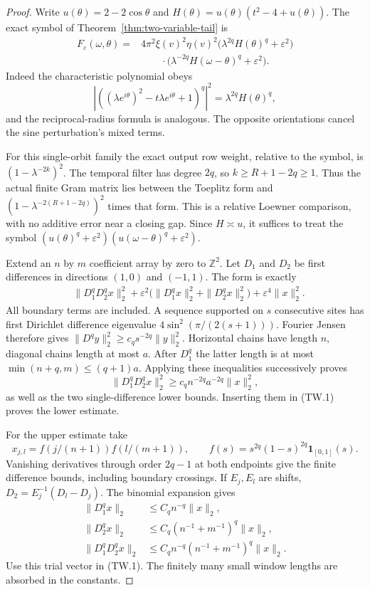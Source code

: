 \begin{proof}
Write $u(\theta)=2-2\cos\theta$ and
$H(\theta)=u(\theta)(t^2-4+u(\theta))$. The exact symbol of
Theorem~\ref{thm:two-variable-tail} is
\begin{align*}
 F_\varepsilon(\omega,\theta)
 ={}&4\pi^2\xi(v)^2\eta(v)^2
       \bigl(\lambda^{2q}H(\theta)^q+\varepsilon^2\bigr)\\
 &\hspace{2em}\cdot
       \bigl(\lambda^{-2q}H(\omega-\theta)^q+\varepsilon^2\bigr).
\end{align*}
Indeed the characteristic polynomial obeys
\[
 |((\lambda e^{i\theta})^2-t\lambda e^{i\theta}+1)^q|^2
       =\lambda^{2q}H(\theta)^q,
\]
and the reciprocal-radius formula is analogous. The opposite orientations
cancel the sine perturbation's mixed terms.

For this single-orbit family the exact output row weight, relative to the
symbol, is $(1-\lambda^{-2k})^2$. The temporal filter has degree $2q$, so
$k\ge R+1-2q\ge1$. Thus the actual finite Gram matrix lies between the
Toeplitz form and
$(1-\lambda^{-2(R+1-2q)})^2$ times that form. This is a relative Loewner
comparison, with no additive error near a closing gap. Since $H\asymp u$,
it suffices to treat the symbol
$(u(\theta)^q+\varepsilon^2)(u(\omega-\theta)^q+\varepsilon^2)$.

Extend an $n$ by $m$ coefficient array by zero to $\mathbb Z^2$. Let $D_1$
and $D_2$ be first differences in directions $(1,0)$ and $(-1,1)$.
The form is exactly
\begin{align*}
 &\|D_1^qD_2^qx\|_2^2
 +\varepsilon^2\bigl(\|D_1^qx\|_2^2+\|D_2^qx\|_2^2\bigr)
 +\varepsilon^4\|x\|_2^2. \tag{TW.1}
\end{align*}
All boundary terms are included. A sequence supported on $s$ consecutive
sites has first Dirichlet difference eigenvalue
$4\sin^2(\pi/(2(s+1)))$. Fourier Jensen therefore gives
$\|D^qy\|_2^2\ge c_qs^{-2q}\|y\|_2^2$.
Horizontal chains have length $n$, diagonal chains length at most $a$.
After $D_1^q$ the latter length is at most
$\min(n+q,m)\le(q+1)a$. Applying these inequalities successively proves
\[
 \|D_1^qD_2^qx\|_2^2\ge c_qn^{-2q}a^{-2q}\|x\|_2^2,
\]
as well as the two single-difference lower bounds. Inserting them in (TW.1)
proves the lower estimate.

For the upper estimate take
\[
 x_{j,l}=f(j/(n+1))f(l/(m+1)),\qquad
 f(s)=s^{2q}(1-s)^{2q}\mathbf1_{[0,1]}(s).
\]
Vanishing derivatives through order $2q-1$ at both endpoints give the finite
difference bounds, including boundary crossings. If $E_j,E_l$ are shifts,
$D_2=E_j^{-1}(D_l-D_j)$. The binomial expansion gives
\begin{align*}
 \|D_1^qx\|_2&\le C_qn^{-q}\|x\|_2,\\
 \|D_2^qx\|_2&\le C_q(n^{-1}+m^{-1})^q\|x\|_2,\\
 \|D_1^qD_2^qx\|_2&\le C_qn^{-q}(n^{-1}+m^{-1})^q\|x\|_2.
\end{align*}
Use this trial vector in (TW.1). The finitely many small window lengths are
absorbed in the constants.
\end{proof}

